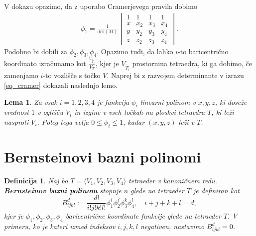 \documentclass[11pt,a4paper]{article}
\newtheorem{definition}{Definicija}
\newtheorem{lemma}{Lema}
\begin{document}
V dokazu opazimo, da z uporabo Cramerjevega pravila dobimo
\begin{align}\label{eq_cramer}
    \phi_1 = \frac{1}{\text{det}(M)}
    \begin{vmatrix}
        1 & 1 & 1 & 1 \\
        x & x_2 & x_3 & x_4 \\
        y & y_2 & y_3 & y_4 \\
        z & z_2 & z_3 & z_4
    \end{vmatrix}.
\end{align}
Podobno bi dobili za $\phi_2, \phi_3, \phi_4$. 
Opazimo tudi, da lahko $i$-to baricentrično koordinato izračunamo
kot $\frac{V_{\widetilde{T_i}}}{V_T}$, kjer je $V_{\widetilde{T_i}}$
prostornina tetraedra, ki ga dobimo, če zamenjamo $i$-to vozlišče
s točko $V$. 
Naprej bi z razvojem determinante v izrazu \eqref{eq_cramer}
dokazali naslednjo lemo.

\begin{lemma}
    Za vsak $i = 1, 2, 3, 4$ je funkcija $\phi_i$ linearni polinom
    v $x, y, z$, ki doseže vrednost $1$ v oglišču $V_i$ in
    izgine v vseh točkah na ploskvi tetraedra $T$, ki leži
    nasproti $V_i$. Poleg tega velja
    $0 \leq \phi_i \leq 1$, kadar $(x, y, z)$ leži v $T$.
\end{lemma}

\section{Bernsteinovi bazni polinomi}

\begin{definition}
    Naj bo $T = \langle V_1, V_2, V_3, V_4 \rangle$ tetraeder v kanoničnem redu.
    \textbf{Bernsteinov bazni polinom} stopnje $n$ glede na tetraeder $T$ je definiran kot
    \begin{equation}
        B_{ijkl}^d := \frac{d!}{i!j!k!l!} \phi_1^i \phi_2^j \phi_3^k \phi_4^l, \quad i + j + k + l = d,
    \end{equation}
    kjer je $\phi_1, \phi_2, \phi_3, \phi_4$ baricentrične koordinate funkcije
    glede na tetraeder $T$. V primeru, ko je kateri izmed indeksov $i, j, k, l$ negativen, 
    nastavimo $B_{ijkl}^d = 0$.
\end{definition}
\end{document}
